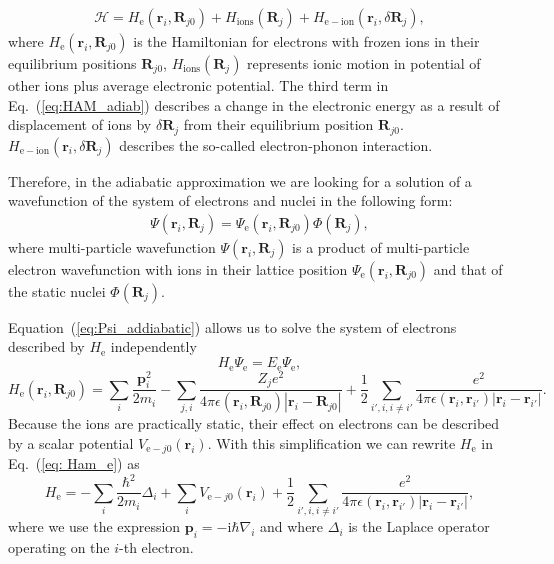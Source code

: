 \begin{eqnarray}
\mathcal{H}=H_\mathrm{e}\left(\mathbf{r}_i,\mathbf{R}_{j0}\right)+H_{\mathrm{ions}}\left(\mathbf{R}_j\right)+H_{\mathrm{e-ion}}\left(\mathbf{r}_i,\delta\mathbf{R}_{j}\right),\label{eq:HAM_adiab}
\end{eqnarray}
%
where $H_\mathrm{e}\left(\mathbf{r}_i,\mathbf{R}_{j0}\right)$ is the Hamiltonian for electrons with frozen ions in their equilibrium positions $\mathbf{R}_{j0}$, $H_{\mathrm{ions}}\left(\mathbf{R}_j\right)$ represents ionic motion in potential of other ions plus average electronic potential. The third term in Eq.~(\ref{eq:HAM_adiab}) describes a change in the electronic energy as a result of displacement of ions by $\delta\mathbf{R}_{j}$ from their equilibrium position $\mathbf{R}_{j0}$. $H_{\mathrm{e-ion}}\left(\mathbf{r}_i,\delta\mathbf{R}_{j}\right)$ describes the so-called electron-phonon interaction.

Therefore, in the adiabatic approximation we are looking for a solution of a wavefunction of the system of electrons and nuclei in the following form:
%
\begin{eqnarray}
\Psi\left(\mathbf{r}_i, \mathbf{R}_{j}\right)=\Psi_\mathrm{e}\left(\mathbf{r}_i,\mathbf{R}_{j0}\right)\Phi\left(\mathbf{R}_j\right),\label{eq:Psi_addiabatic}
\end{eqnarray}
%
where multi-particle wavefunction $\Psi\left(\mathbf{r}_i, \mathbf{R}_{j}\right)$ is a product of multi-particle electron wavefunction with ions in their lattice position $\Psi_\mathrm{e}\left(\mathbf{r}_i,\mathbf{R}_{j0}\right)$ and that of the static nuclei $\Phi\left(\mathbf{R}_j\right)$.

Equation~(\ref{eq:Psi_addiabatic}) allows us to solve the system of electrons described by $H_\mathrm{e}$ independently
\begin{equation}
H_\mathrm{e}\Psi_\mathrm{e}=E_\mathrm{e}\Psi_\mathrm{e},
\end{equation}
\begin{equation}
H_\mathrm{e}\left(\mathbf{r}_i,\mathbf{R}_{j0}\right)=\sum_{i} \frac{\mathbf{p}_i^2}{2m_i}- \sum_{j, i} \frac{Z_j e^2}{4\pi \epsilon(\mathbf{r}_i, \mathbf{R}_{j0}) |\mathbf{r}_i-\mathbf{R}_{j0}|} + \frac{1}{2}\sum_{i', i, i\neq i'} \frac{e^2}{4\pi \epsilon(\mathbf{r}_i, \mathbf{r}_{i'})  |\mathbf{r}_i-\mathbf{r}_{i'}|} .\label{eq: Ham_e}
\end{equation}
%
Because the ions are practically static, their effect on electrons can be described by a scalar potential $V_{\mathrm{e}-j0}\left(\mathbf{r}_i\right)$. With this simplification we can rewrite $H_\mathrm{e}$ in Eq.~(\ref{eq: Ham_e}) as
\begin{equation}
H_\mathrm{e}=-\sum_{i} \frac{\hbar^2}{2m_i}\Delta_i+\sum_i V_{\mathrm{e}-j0}\left(\mathbf{r}_i\right) + \frac{1}{2}\sum_{i', i, i\neq i'} \frac{e^2}{4\pi \epsilon(\mathbf{r}_i, \mathbf{r}_{i'})  |\mathbf{r}_i-\mathbf{r}_{i'}|},\label{eq: Ham_e2}
\end{equation}
where we use the expression $\mathbf{p}_i=-\mathrm{i}\hbar\nabla_i$ and where $\Delta_i$ is the Laplace operator operating on the $i$-th electron.



